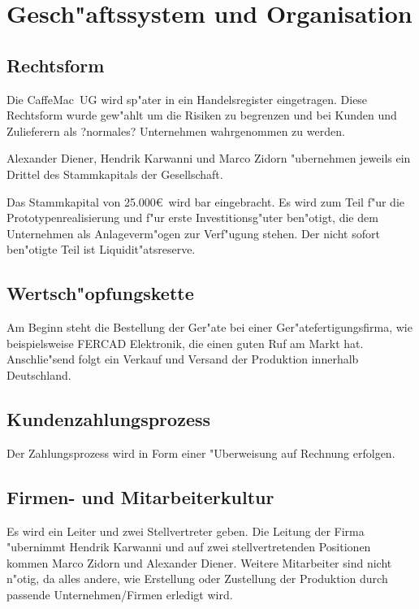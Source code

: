 \section{Gesch"aftssystem und Organisation}
\def \name {CaffeMac}
\def \startkapital {25.000\euro}

\subsection{Rechtsform}
Die \name\ UG wird sp"ater in ein Handelsregister eingetragen. Diese Rechtsform wurde gew"ahlt um die Risiken
zu begrenzen und bei Kunden und Zulieferern als ?normales? Unternehmen wahrgenommen zu werden.

Alexander Diener, Hendrik Karwanni und Marco Zidorn "ubernehmen jeweils ein Drittel des Stammkapitals der Gesellschaft.

Das Stammkapital von \startkapital\ wird bar eingebracht. Es wird zum Teil f"ur die Prototypenrealisierung und f"ur erste Investitionsg"uter ben"otigt, die dem Unternehmen als Anlageverm"ogen zur Verf"ugung stehen. Der nicht sofort ben"otigte Teil ist Liquidit"atsreserve.

\subsection{Wertsch"opfungskette}
Am Beginn steht die Bestellung der Ger"ate bei einer Ger"atefertigungsfirma, wie beispielsweise FERCAD Elektronik, die einen guten Ruf am Markt hat. Anschlie"send folgt ein Verkauf und Versand der Produktion innerhalb Deutschland.

\subsection{Kundenzahlungsprozess}
Der Zahlungsprozess wird in Form einer "Uberweisung auf Rechnung erfolgen.

\subsection{Firmen- und Mitarbeiterkultur}
Es wird ein Leiter und zwei Stellvertreter geben.
Die Leitung der Firma "ubernimmt Hendrik Karwanni und auf zwei stellvertretenden Positionen kommen Marco Zidorn und Alexander Diener.
Weitere Mitarbeiter sind nicht n"otig, da alles andere, wie Erstellung oder Zustellung der Produktion durch passende Unternehmen/Firmen erledigt wird.